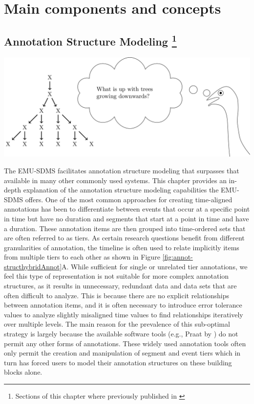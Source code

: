 \documentclass[]{book}
\let\rmarkdownfootnote\footnote%
\def\footnote{\protect\rmarkdownfootnote}
\begin{document}
\hypertarget{part-main-components-and-concepts}{%
\part{Main components and concepts}\label{part-main-components-and-concepts}}

\hypertarget{chap:annot-struct-mod}{%
\chapter[Annotation Structure Modeling ]{\texorpdfstring{Annotation Structure Modeling \footnote{Sections of this chapter where previously published in \citet{winkelmann:2017aa}}}{Annotation Structure Modeling }}\label{chap:annot-struct-mod}}

\begin{center}\includegraphics[width=0.75\linewidth]{pics/EMU-webAppEmu_annotStruct} \end{center}

The EMU-SDMS facilitates annotation structure modeling that surpasses that available in many other commonly used systems. This chapter provides an in-depth explanation of the annotation structure modeling capabilities the EMU-SDMS offers. One of the most common approaches for creating time-aligned annotations has been to differentiate between events that occur at a specific point in time but have no duration and segments that start at a point in time and have a duration. These annotation items are then grouped into time-ordered sets that are often referred to as tiers. As certain research questions benefit from different granularities of annotation, the timeline is often used to relate implicitly items from multiple tiers to each other as shown in Figure \ref{fig:annot-structhybridAnnot}A. While sufficient for single or unrelated tier annotations, we feel this type of representation is not suitable for more complex annotation structures, as it results in unnecessary, redundant data and data sets that are often difficult to analyze. This is because there are no explicit relationships between annotation items, and it is often necessary to introduce error tolerance values to analyze slightly misaligned time values to find relationships iteratively over multiple levels. The main reason for the prevalence of this sub-optimal strategy is largely because the available software tools (e.g., Praat by \citet{boersma:2011a}) do not permit any other forms of annotations. These widely used annotation tools often only permit the creation and manipulation of segment and event tiers which in turn has forced users to model their annotation structures on these building blocks alone.
\end{document}
